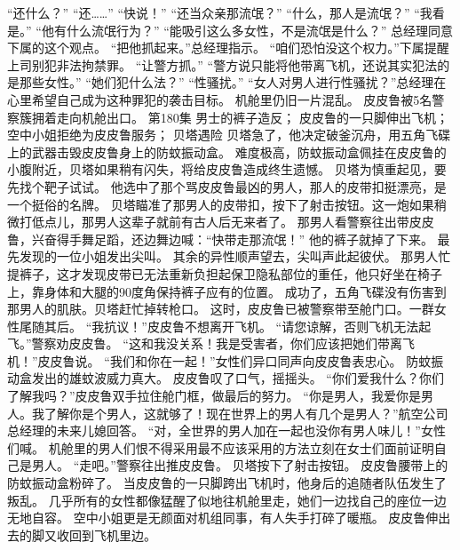 \documentclass[a4paper,12pt,UTF8,twoside]{ctexbook}
\begin{document}
        “还什么？” 
        “还……” 
        “快说！” 
        “还当众亲那流氓？” 
        “什么，那人是流氓？” 
        “我看是。” 
        “他有什么流氓行为？” 
        “能吸引这么多女性，不是流氓是什么？” 
        总经理同意下属的这个观点。 
        “把他抓起来。”总经理指示。 
        “咱们恐怕没这个权力。”下属提醒上司别犯非法拘禁罪。 
        “让警方抓。” 
        “警方说只能将他带离飞机，还说其实犯法的是那些女性。” 
        “她们犯什么法？” 
        “性骚扰。” 
        “女人对男人进行性骚扰？”总经理在心里希望自己成为这种罪犯的袭击目标。 
        机舱里仍旧一片混乱。 
        皮皮鲁被5名警察簇拥着走向机舱出口。   第180集 
        男士的裤子造反； 
        皮皮鲁的一只脚伸出飞机； 
        空中小姐拒绝为皮皮鲁服务； 
        贝塔遇险   
        贝塔急了，他决定破釜沉舟，用五角飞碟上的武器击毁皮皮鲁身上的防蚊振动盒。 
        难度极高，防蚊振动盒佩挂在皮皮鲁的小腹附近，贝塔如果稍有闪失，将给皮皮鲁造成终生遗憾。 
        贝塔为慎重起见，要先找个靶子试试。 
        他选中了那个骂皮皮鲁最凶的男人，那人的皮带扣挺漂亮，是一个挺俗的名牌。 
        贝塔瞄准了那男人的皮带扣，按下了射击按钮。这一炮如果稍微打低点儿，那男人这辈子就前有古人后无来者了。 
        那男人看警察往出带皮皮鲁，兴奋得手舞足蹈，还边舞边喊：“快带走那流氓！” 
        他的裤子就掉了下来。 
        最先发现的一位小姐发出尖叫。 
        其余的异性顺声望去，尖叫声此起彼伏。 
        那男人忙提裤子，这才发现皮带已无法重新负担起保卫隐私部位的重任，他只好坐在椅子上，靠身体和大腿的90度角保持裤子应有的位置。 
        成功了，五角飞碟没有伤害到那男人的肌肤。贝塔赶忙掉转枪口。 
        这时，皮皮鲁已被警察带至舱门口。一群女性尾随其后。 
        “我抗议！”皮皮鲁不想离开飞机。 
        “请您谅解，否则飞机无法起飞。”警察劝皮皮鲁。 
        “这和我没关系！我是受害者，你们应该把她们带离飞机！”皮皮鲁说。 
        “我们和你在一起！”女性们异口同声向皮皮鲁表忠心。 
        防蚊振动盒发出的雄蚊波威力真大。 
        皮皮鲁叹了口气，摇摇头。 
        “你们爱我什么？你们了解我吗？”皮皮鲁双手拉住舱门框，做最后的努力。 
        “你是男人，我爱你是男人。我了解你是个男人，这就够了！现在世界上的男人有几个是男人？”航空公司总经理的未来儿媳回答。 
        “对，全世界的男人加在一起也没你有男人味儿！”女性们喊。 
        机舱里的男人们恨不得采用最不应该采用的方法立刻在女士们面前证明自己是男人。 
        “走吧。”警察往出推皮皮鲁。 
        贝塔按下了射击按钮。 
        皮皮鲁腰带上的防蚊振动盒粉碎了。 
        当皮皮鲁的一只脚跨出飞机时，他身后的追随者队伍发生了叛乱。 
        几乎所有的女性都像猛醒了似地往机舱里走，她们一边找自己的座位一边无地自容。 
        空中小姐更是无颜面对机组同事，有人失手打碎了暖瓶。 
        皮皮鲁伸出去的脚又收回到飞机里边。 
\end{document}
